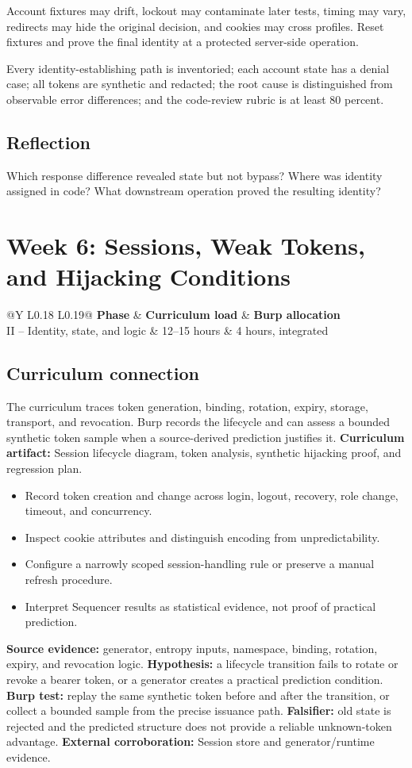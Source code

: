 \documentclass[11pt]{article}
\makeatletter
\newcommand{\weekheader}[5]{%
  \clearpage
  \section{Week #1: #2}
  \begin{tcolorbox}[colback=Navy,colframe=Navy,coltext=white]
    \begin{tabularx}{\linewidth}{@{}Y L{0.18\linewidth} L{0.19\linewidth}@{}}
      \textbf{Phase} & \textbf{Curriculum load} & \textbf{Burp allocation}\\
      #3 & #4 hours & #5 hours, integrated
    \end{tabularx}
  \end{tcolorbox}
}
\newcommand{\weekfield}[2]{%
  \Needspace{5\baselineskip}
  \subsection*{#1}
  #2
}
\newcommand{\curriculumartifact}[1]{\textbf{Curriculum artifact:} #1}
\newcommand{\externalproof}[1]{\textbf{External corroboration:} #1}
\makeatother
\begin{document}
\begin{troubleshootingbox}
Account fixtures may drift, lockout may contaminate later tests, timing may vary,
redirects may hide the original decision, and cookies may cross profiles. Reset
fixtures and prove the final identity at a protected server-side operation.
\end{troubleshootingbox}

\begin{checkpoints}
Every identity-establishing path is inventoried; each account state has a denial
case; all tokens are synthetic and redacted; the root cause is distinguished
from observable error differences; and the code-review rubric is at least 80
percent.
\end{checkpoints}

\weekfield{Reflection}{Which response difference revealed state but not bypass?
Where was identity assigned in code? What downstream operation proved the
resulting identity?}

\weekheader{6}{Sessions, Weak Tokens, and Hijacking Conditions}{II -- Identity, state, and logic}{12--15}{4}

\weekfield{Curriculum connection}{The curriculum traces token generation,
binding, rotation, expiry, storage, transport, and revocation. Burp records the
lifecycle and can assess a bounded synthetic token sample when a source-derived
prediction justifies it. \curriculumartifact{Session lifecycle diagram, token
analysis, synthetic hijacking proof, and regression plan.}}

\begin{objectivebox}
\begin{itemize}
  \item Record token creation and change across login, logout, recovery, role change, timeout, and concurrency.
  \item Inspect cookie attributes and distinguish encoding from unpredictability.
  \item Configure a narrowly scoped session-handling rule or preserve a manual refresh procedure.
  \item Interpret Sequencer results as statistical evidence, not proof of practical prediction.
\end{itemize}
\end{objectivebox}

\begin{bridgebox}
\textbf{Source evidence:} generator, entropy inputs, namespace, binding, rotation,
expiry, and revocation logic. \textbf{Hypothesis:} a lifecycle transition fails
to rotate or revoke a bearer token, or a generator creates a practical prediction
condition. \textbf{Burp test:} replay the same synthetic token before and after
the transition, or collect a bounded sample from the precise issuance path.
\textbf{Falsifier:} old state is rejected and the predicted structure does not
provide a reliable unknown-token advantage. \externalproof{Session store and
generator/runtime evidence.}
\end{bridgebox}
\end{document}
